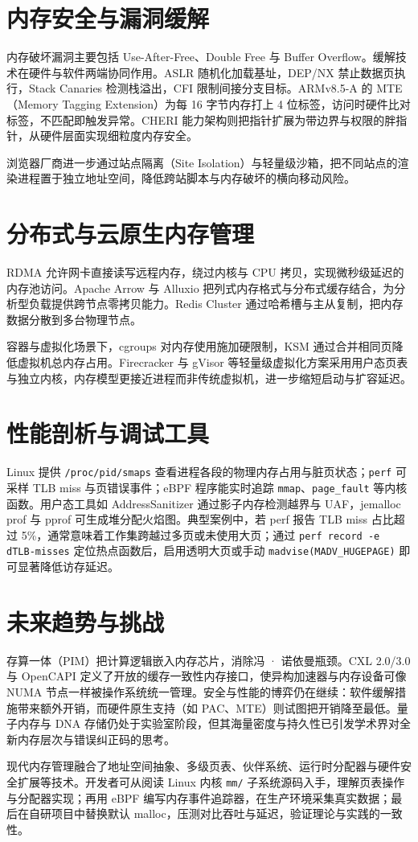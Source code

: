 \chapter{内存安全与漏洞缓解}
内存破坏漏洞主要包括 Use-After-Free、Double Free 与 Buffer Overflow。缓解技术在硬件与软件两端协同作用。ASLR 随机化加载基址，DEP/NX 禁止数据页执行，Stack Canaries 检测栈溢出，CFI 限制间接分支目标。ARMv8.5-A 的 MTE（Memory Tagging Extension）为每 16 字节内存打上 4 位标签，访问时硬件比对标签，不匹配即触发异常。CHERI 能力架构则把指针扩展为带边界与权限的胖指针，从硬件层面实现细粒度内存安全。\par
浏览器厂商进一步通过站点隔离（Site Isolation）与轻量级沙箱，把不同站点的渲染进程置于独立地址空间，降低跨站脚本与内存破坏的横向移动风险。\par
\chapter{分布式与云原生内存管理}
RDMA 允许网卡直接读写远程内存，绕过内核与 CPU 拷贝，实现微秒级延迟的内存池访问。Apache Arrow 与 Alluxio 把列式内存格式与分布式缓存结合，为分析型负载提供跨节点零拷贝能力。Redis Cluster 通过哈希槽与主从复制，把内存数据分散到多台物理节点。\par
容器与虚拟化场景下，cgroups 对内存使用施加硬限制，KSM 通过合并相同页降低虚拟机总内存占用。Firecracker 与 gVisor 等轻量级虚拟化方案采用用户态页表与独立内核，内存模型更接近进程而非传统虚拟机，进一步缩短启动与扩容延迟。\par
\chapter{性能剖析与调试工具}
Linux 提供 \texttt{/proc/pid/smaps} 查看进程各段的物理内存占用与脏页状态；\texttt{perf} 可采样 TLB miss 与页错误事件；eBPF 程序能实时追踪 \texttt{mmap}、\texttt{page\_{}fault} 等内核函数。用户态工具如 AddressSanitizer 通过影子内存检测越界与 UAF，jemalloc prof 与 pprof 可生成堆分配火焰图。典型案例中，若 perf 报告 TLB miss 占比超过 5\%{}，通常意味着工作集跨越过多页或未使用大页；通过 \texttt{perf record -e dTLB-misses} 定位热点函数后，启用透明大页或手动 \texttt{madvise(MADV\_{}HUGEPAGE)} 即可显著降低访存延迟。\par
\chapter{未来趋势与挑战}
存算一体（PIM）把计算逻辑嵌入内存芯片，消除冯 · 诺依曼瓶颈。CXL 2.0/3.0 与 OpenCAPI 定义了开放的缓存一致性内存接口，使异构加速器与内存设备可像 NUMA 节点一样被操作系统统一管理。安全与性能的博弈仍在继续：软件缓解措施带来额外开销，而硬件原生支持（如 PAC、MTE）则试图把开销降至最低。量子内存与 DNA 存储仍处于实验室阶段，但其海量密度与持久性已引发学术界对全新内存层次与错误纠正码的思考。\par
现代内存管理融合了地址空间抽象、多级页表、伙伴系统、运行时分配器与硬件安全扩展等技术。开发者可从阅读 Linux 内核 \texttt{mm/} 子系统源码入手，理解页表操作与分配器实现；再用 eBPF 编写内存事件追踪器，在生产环境采集真实数据；最后在自研项目中替换默认 malloc，压测对比吞吐与延迟，验证理论与实践的一致性。\par
